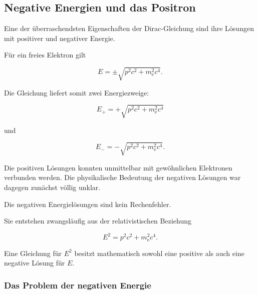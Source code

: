 
\subsection{Negative Energien und das Positron}
\label{subsec:negative_energien_und_positron}

Eine der überraschendsten Eigenschaften der Dirac-Gleichung%
sind ihre Lösungen mit positiver und negativer Energie.

Für ein freies Elektron gilt

\begin{equation}
	E
	=
	\pm
	\sqrt{
		p^2c^2
		+
		m_{\mathrm e}^2c^4
	}.
	\label{eq:energiezweige_dirac_positron}
\end{equation}

Die Gleichung liefert somit zwei Energiezweige:

\begin{equation}
	E_{+}
	=
	+
	\sqrt{
		p^2c^2
		+
		m_{\mathrm e}^2c^4
	}
\end{equation}

und

\begin{equation}
	E_{-}
	=
	-
	\sqrt{
		p^2c^2
		+
		m_{\mathrm e}^2c^4
	}.
\end{equation}

Die positiven Lösungen konnten unmittelbar mit gewöhnlichen
Elektronen verbunden werden. Die physikalische Bedeutung der negativen
Lösungen war dagegen zunächst völlig unklar.

\begin{PhysicsBox}
	\label{box:zwei_unvermeidbare_energiezweige}
	
	Die negativen Energielösungen sind kein Rechenfehler.
	
	Sie entstehen zwangsläufig aus der relativistischen Beziehung
	
	\begin{equation}
		E^2
		=
		p^2c^2
		+
		m_{\mathrm e}^2c^4.
	\end{equation}
	
	Eine Gleichung für \(E^2\) besitzt mathematisch sowohl eine positive
	als auch eine negative Lösung für \(E\).
\end{PhysicsBox}

\subsubsection*{Das Problem der negativen Energie}

